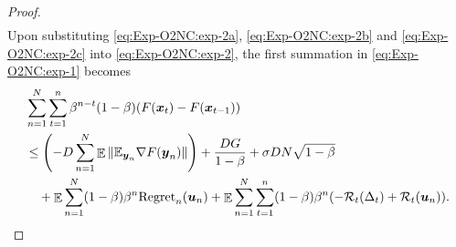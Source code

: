 \begin{proof}
\begin{align}
    \label{eq:Exp-O2NC:exp-2c}
\end{align}
Upon substituting \eqref{eq:Exp-O2NC:exp-2a}, \eqref{eq:Exp-O2NC:exp-2b} and \eqref{eq:Exp-O2NC:exp-2c} into \eqref{eq:Exp-O2NC:exp-2}, the first summation in \eqref{eq:Exp-O2NC:exp-1} becomes
\begin{align}
    &\sum_{n=1}^N\sum_{t=1}^n \beta^{n-t}(1-\beta)(F({\boldsymbol{x}}_t)-F({\boldsymbol{x}}_{t-1})) \notag\\
    &\le \left(-D\sum_{n=1}^N \mathop{\mathbb{E}} \|\mathbb{E}_{{\boldsymbol{y}}_n} \nabla F({\boldsymbol{y}}_n)\| \right) + \frac{DG}{1-\beta} + \sigma DN\sqrt{1-\beta} \notag\\
    &\quad + \mathop{\mathbb{E}}\sum_{n=1}^N (1-\beta)\beta^n \mathrm{Regret}_n({\boldsymbol{u}}_n) + \mathop{\mathbb{E}}\sum_{n=1}^N\sum_{t=1}^n (1-\beta)\beta^n ( -{\cal R}_t(\Delta_t) + {\cal R}_t({\boldsymbol{u}}_n)).
    \label{eq:Exp-O2NC:exp-2d}
\end{align}


\end{proof}
